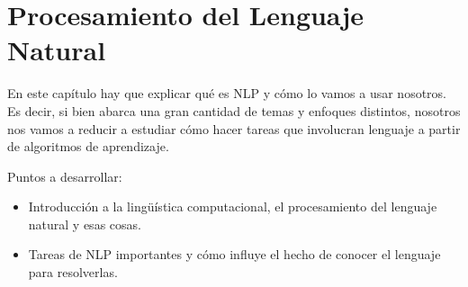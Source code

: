 \section{Procesamiento del Lenguaje Natural}

En este capítulo hay que explicar qué es NLP y cómo lo vamos a usar nosotros. Es decir, si bien abarca una gran cantidad de temas y enfoques distintos, nosotros nos vamos a reducir a estudiar cómo hacer tareas que involucran lenguaje a partir de algoritmos de aprendizaje.

Puntos a desarrollar:

\begin{itemize}
\item Introducción a la lingüística computacional, el procesamiento del lenguaje natural y esas cosas.
\item Tareas de NLP importantes y cómo influye el hecho de conocer el lenguaje para resolverlas.
\end{itemize}